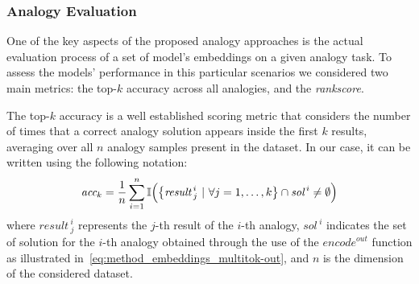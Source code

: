 \subsubsection{Analogy Evaluation}\label{subsubsec:method_embeddings_evaluation}

One of the key aspects of the proposed analogy approaches is the actual evaluation process of a set of model's embeddings on a given analogy task.
To assess the models' performance in this particular scenarios we considered two main metrics: the top-$k$ accuracy across all analogies, and the \emph{rankscore}.

The top-$k$ accuracy is a well established scoring metric that considers the number of times that a correct analogy solution appears inside the first $k$ results, averaging over all $n$ analogy samples present in the dataset.
In our case, it can be written using the following notation:
\begin{equation}
    \label{eq:method_embeddings_topk-accuracy}
    \textit{acc}_k = \frac{1}{n} \sum_{i=1}^{n} \mathbb{I}\Bigl( {\left\{ {\textit{result}\,}^i_j \ |\ \forall j = 1,\ldots,k \right\}} \cap {\textit{sol}\,}^i \neq \emptyset \Bigr)
\end{equation}
where ${\textit{result}\,}^i_j$ represents the $j$-th result of the $i$-th analogy, ${\textit{sol}\,}^i$ indicates the set of solution for the $i$-th analogy obtained through the use of the ${\textit{encode}}^{out}$ function as illustrated in~\cref{eq:method_embeddings_multitok-out}, and $n$ is the dimension of the considered dataset.



